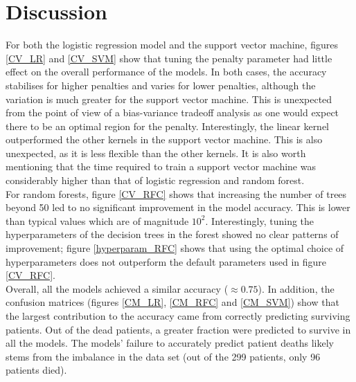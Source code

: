 \documentclass[notitlepage, reprint, nofootinbib]{revtex4-1}
\begin{document}
\section{Discussion}
For both the logistic regression model and the support vector machine, figures \ref{CV_LR} and \ref{CV_SVM} show that tuning the penalty parameter had little effect on the overall performance of the models. In both cases, the accuracy stabilises for higher penalties and varies for lower penalties, although the variation is much greater for the support vector machine. This is unexpected from the point of view of a bias-variance tradeoff analysis as one would expect there to be an optimal region for the penalty. Interestingly, the linear kernel outperformed the other kernels in the support vector machine. This is also unexpected, as it is less flexible than the other kernels. It is also worth mentioning that the time required to train a support vector machine was considerably higher than that of logistic regression and random forest.\\[2mm]
For random forests, figure \ref{CV_RFC} shows that increasing the number of trees beyond 50 led to no significant improvement in the model accuracy. This is lower than typical values which are of magnitude $10^2$. \cite{ESL} Interestingly, tuning the hyperparameters of the decision trees in the forest showed no clear patterns of improvement; figure \ref{hyperparam_RFC} shows that using the optimal choice of hyperparameters does not outperform the default parameters used in figure \ref{CV_RFC}. \\[2mm]
Overall, all the models achieved a similar accuracy ($\approx 0.75$). In addition, the confusion matrices (figures \ref{CM_LR}, \ref{CM_RFC} and \ref{CM_SVM}) show that the largest contribution to the accuracy came from correctly predicting surviving patients. Out of the dead patients, a greater fraction were predicted to survive in all the models. The models' failure to accurately predict patient deaths likely stems from the imbalance in the data set (out of the 299 patients, only 96 patients died). \\[2mm] 
\end{document}
